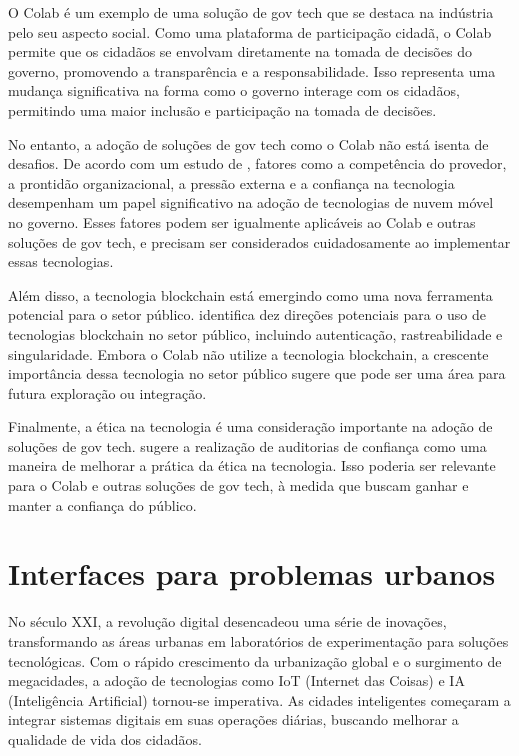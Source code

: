 O Colab é um exemplo de uma solução de gov tech que se destaca na indústria pelo seu aspecto social. Como uma plataforma de participação cidadã, o Colab permite que os cidadãos se envolvam diretamente na tomada de decisões do governo, promovendo a transparência e a responsabilidade. Isso representa uma mudança significativa na forma como o governo interage com os cidadãos, permitindo uma maior inclusão e participação na tomada de decisões.

No entanto, a adoção de soluções de gov tech como o Colab não está isenta de desafios. De acordo com um estudo de , fatores como a competência do provedor, a prontidão organizacional, a pressão externa e a confiança na tecnologia desempenham um papel significativo na adoção de tecnologias de nuvem móvel no governo. Esses fatores podem ser igualmente aplicáveis ao Colab e outras soluções de gov tech, e precisam ser considerados cuidadosamente ao implementar essas tecnologias.

Além disso, a tecnologia blockchain está emergindo como uma nova ferramenta potencial para o setor público.  identifica dez direções potenciais para o uso de tecnologias blockchain no setor público, incluindo autenticação, rastreabilidade e singularidade. Embora o Colab não utilize a tecnologia blockchain, a crescente importância dessa tecnologia no setor público sugere que pode ser uma área para futura exploração ou integração.

Finalmente, a ética na tecnologia é uma consideração importante na adoção de soluções de gov tech.  sugere a realização de auditorias de confiança como uma maneira de melhorar a prática da ética na tecnologia. Isso poderia ser relevante para o Colab e outras soluções de gov tech, à medida que buscam ganhar e manter a confiança do público.

\section*{Interfaces para problemas urbanos}
No século XXI, a revolução digital desencadeou uma série de inovações, transformando as áreas urbanas em laboratórios de experimentação para soluções tecnológicas. Com o rápido crescimento da urbanização global e o surgimento de megacidades, a adoção de tecnologias como IoT (Internet das Coisas) e IA (Inteligência Artificial) tornou-se imperativa. As cidades inteligentes começaram a integrar sistemas digitais em suas operações diárias, buscando melhorar a qualidade de vida dos cidadãos.

